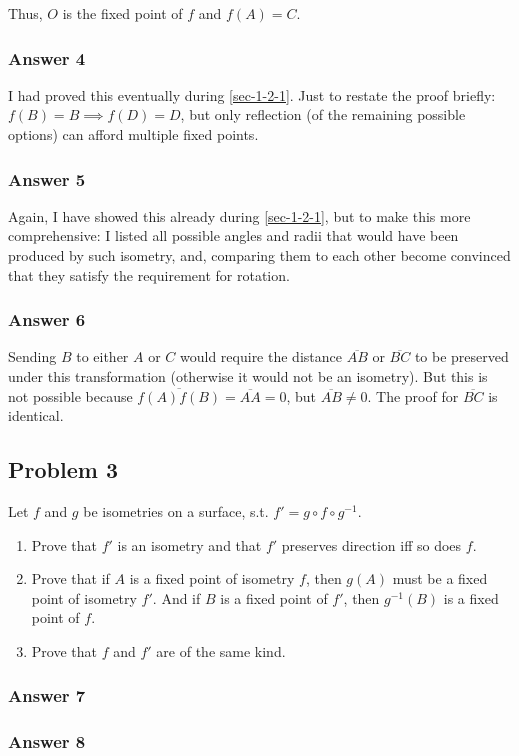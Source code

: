 \documentclass[11pt]{article}
\begin{document}
Thus, $O$ is the fixed point of $f$ and $f(A)=C$.
\subsubsection{Answer 4}
\label{sec-1-2-2}
I had proved this eventually during \ref{sec-1-2-1}.  Just to restate the proof
briefly:  $f(B)=B \implies f(D)=D$, but only reflection (of the remaining
possible options) can afford multiple fixed points.
\subsubsection{Answer 5}
\label{sec-1-2-3}
Again, I have showed this already during \ref{sec-1-2-1}, but to make this more
comprehensive: I listed all possible angles and radii that would have been
produced by such isometry, and, comparing them to each other become
convinced that they satisfy the requirement for rotation.
\subsubsection{Answer 6}
\label{sec-1-2-4}
Sending $B$ to either $A$ or $C$ would require the distance $\overline{AB}$
or $\overline{BC}$ to be preserved under this transformation (otherwise it
would not be an isometry).  But this is not possible because
$\overline{f(A)f(B)}=\overline{AA}=0$, but $\overline{AB} \neq 0$. The proof
for $\overline{BC}$ is identical.
\subsection{Problem 3}
\label{sec-1-3}
Let $f$ and $g$ be isometries on a surface, s.t. $f'=g \circ f \circ g^{-1}$.

\begin{enumerate}
\item Prove that $f'$ is an isometry and that $f'$ preserves direction iff
so does $f$.
\item Prove that if $A$ is a fixed point of isometry $f$, then $g(A)$ must
be a fixed point of isometry $f'$.  And if $B$ is a fixed point of
$f'$, then $g^{-1}(B)$ is a fixed point of $f$.
\item Prove that $f$ and $f'$ are of the same kind.
\end{enumerate}

\subsubsection{Answer 7}
\label{sec-1-3-1}
\subsubsection{Answer 8}
\label{sec-1-3-2}
\end{document}
